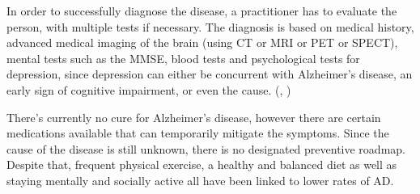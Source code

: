 {In order to successfully diagnose the disease, a practitioner has to evaluate the person, with multiple tests if necessary. The diagnosis is based on medical history, advanced medical imaging of the brain (using CT or MRI or PET or SPECT), mental tests such as the MMSE, blood tests and psychological tests for depression, since depression can either be concurrent with Alzheimer's disease, an early sign of cognitive impairment, or even the cause. (\cite{25}, \cite{26})

There's currently no cure for Alzheimer's disease, however there are certain medications available that can temporarily mitigate the symptoms. Since the cause of the disease is still unknown, there is no designated preventive roadmap. Despite that, frequent physical exercise, a healthy and balanced diet as well as staying mentally and socially active all have been linked to lower rates of AD. 
}
